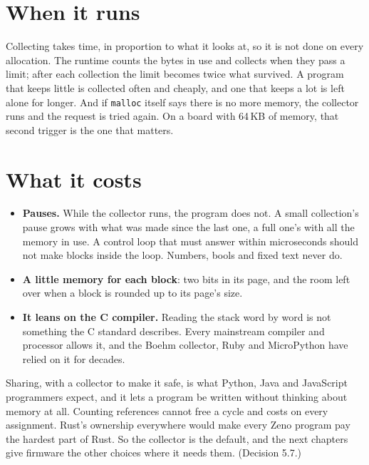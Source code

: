 \section{When it runs}

Collecting takes time, in proportion to what it looks at, so it is
not done on every allocation. The runtime counts the bytes in use and
collects when they pass a limit; after each collection the limit
becomes twice what survived. A program that keeps little is collected
often and cheaply, and one that keeps a lot is left alone for longer.
And if \verb|malloc| itself says there is no more memory, the collector
runs and the request is tried again. On a board with 64\,KB of memory,
that second trigger is the one that matters.

\section{What it costs}

\begin{itemize}
\item \textbf{Pauses.} While the collector runs, the program does not.
  A small collection's pause grows with what was made since the last
  one, a full one's with all the memory in use. A control loop that must
  answer within microseconds should not make blocks inside the loop.
  Numbers, bools and fixed text never do.
\item \textbf{A little memory for each block}: two bits in its page,
  and the room left over when a block is rounded up to its page's size.
\item \textbf{It leans on the C compiler.} Reading the stack word by
  word is not something the C standard describes. Every mainstream
  compiler and processor allows it, and the Boehm collector, Ruby and
  MicroPython have relied on it for decades.
\end{itemize}

\begin{why}
Sharing, with a collector to make it safe, is what Python, Java and
JavaScript programmers expect, and it lets a program be written without
thinking about memory at all. Counting references cannot free a cycle
and costs on every assignment. Rust's ownership everywhere would make
every Zeno program pay the hardest part of Rust. So the collector is
the default, and the next chapters give firmware the other choices
where it needs them. (Decision 5.7.)
\end{why}

